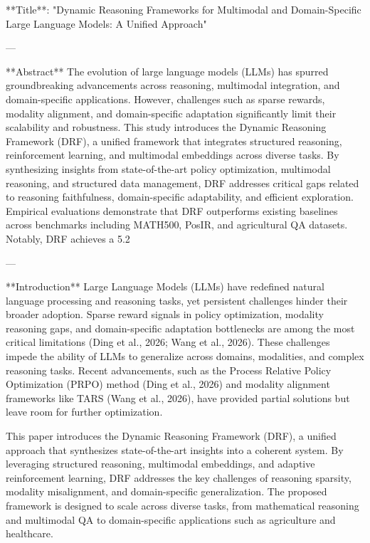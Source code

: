 **Title**: "Dynamic Reasoning Frameworks for Multimodal and Domain-Specific Large Language Models: A Unified Approach"

---

**Abstract**  
The evolution of large language models (LLMs) has spurred groundbreaking advancements across reasoning, multimodal integration, and domain-specific applications. However, challenges such as sparse rewards, modality alignment, and domain-specific adaptation significantly limit their scalability and robustness. This study introduces the Dynamic Reasoning Framework (DRF), a unified framework that integrates structured reasoning, reinforcement learning, and multimodal embeddings across diverse tasks. By synthesizing insights from state-of-the-art policy optimization, multimodal reasoning, and structured data management, DRF addresses critical gaps related to reasoning faithfulness, domain-specific adaptability, and efficient exploration. Empirical evaluations demonstrate that DRF outperforms existing baselines across benchmarks including MATH500, PosIR, and agricultural QA datasets. Notably, DRF achieves a 5.2%

---

**Introduction**  
Large Language Models (LLMs) have redefined natural language processing and reasoning tasks, yet persistent challenges hinder their broader adoption. Sparse reward signals in policy optimization, modality reasoning gaps, and domain-specific adaptation bottlenecks are among the most critical limitations (Ding et al., 2026; Wang et al., 2026). These challenges impede the ability of LLMs to generalize across domains, modalities, and complex reasoning tasks. Recent advancements, such as the Process Relative Policy Optimization (PRPO) method (Ding et al., 2026) and modality alignment frameworks like TARS (Wang et al., 2026), have provided partial solutions but leave room for further optimization.

This paper introduces the Dynamic Reasoning Framework (DRF), a unified approach that synthesizes state-of-the-art insights into a coherent system. By leveraging structured reasoning, multimodal embeddings, and adaptive reinforcement learning, DRF addresses the key challenges of reasoning sparsity, modality misalignment, and domain-specific generalization. The proposed framework is designed to scale across diverse tasks, from mathematical reasoning and multimodal QA to domain-specific applications such as agriculture and healthcare.

